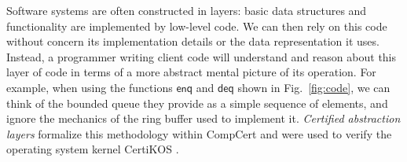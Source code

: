 \documentclass[acmsmall,screen,review,anonymous]{acmart}
\newcommand{\kw}[1]{\ensuremath{ \mathsf{#1} }}
\begin{document}
\begin{example} \label{ex:overview:lint} %

Software systems are often constructed in layers:
basic data structures and functionality
are implemented by low-level code.
We can then rely on this code
without concern its implementation details
or the data representation it uses.
Instead,
a programmer writing client code
will understand and reason about
this layer of code
in terms of a more abstract mental picture
of its operation.
For example,
when using the functions $\kw{enq}$ and $\kw{deq}$
shown in Fig.~\ref{fig:code},
we can think of the bounded queue they provide
as a simple sequence of elements,
and ignore the mechanics
of the ring buffer used to implement it.
\emph{Certified abstraction layers}
formalize this methodology within CompCert
and were used to verify the operating system kernel
CertiKOS \cite{popl15}.


\end{example}
\end{document}
